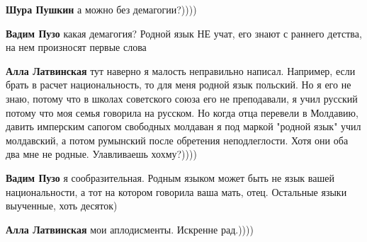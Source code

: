 \begin{itemize}
\begin{itemize}
 
\textbf{Шура Пушкин} а можно без демагогии?))))

 
\textbf{Вадим Пузо} какая демагогия? Родной язык НЕ учат, его знают с раннего детства, на нем произносят первые слова

 
\textbf{Алла Латвинская} тут наверно я малость неправильно написал. Например,
если брать в расчет национальность, то для меня родной язык польский. Но я его
не знаю, потому что в школах советского союза его не преподавали, я учил
русский потому что моя семья говорила на русском. Но когда отца перевели в
Молдавию, давить имперским сапогом свободных молдаван я под маркой "родной
язык" учил молдавский, а потом румынский после обретения неподлеглости. Хотя
они оба два мне не родные. Улавливаешь хохму?))))

 
\textbf{Вадим Пузо} я сообразительная. Родным языком может быть не язык вашей
национальности, а тот на котором говорила ваша мать, отец. Остальные языки
выученные, хоть десяток)

 
\textbf{Алла Латвинская} мои аплодисменты. Искренне рад.))))
\end{itemize}


\end{itemize}
